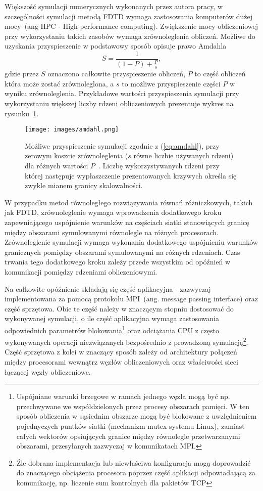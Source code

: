 
Większość symulacji numerycznych wykonanych przez autora pracy, w szczególności symulacji metodą FDTD wymaga zastosowania komputerów dużej mocy~(ang HPC - High-performance computing). Zwiększenie mocy obliczeniowej przy wykorzystaniu takich zasobów wymaga zrównoleglenia obliczeń. Możliwe do uzyskania przyspieszenie w podstawowy sposób opisuje prawo Amdahla
\begin{equation}
	S=\frac{1}{(1-P)+\frac{P}{s}},
	\label{eq:amdahl}
\end{equation}
gdzie przez $S$ oznaczono całkowite przyspieszenie obliczeń, $P$ to część obliczeń która może zostać zrównoleglona, a $s$ to możliwe przyspieszenie części $P$ w wyniku zrównoleglenia. Przykładowe wartości przyspieszenia symulacji przy wykorzystaniu większej liczby rdzeni obliczeniowych prezentuje wykres na rysunku~\ref{fig:amdhal}.

\begin{figure}[htb]
	\texttt{[image: images/amdahl.png]}
	\caption{Możliwe przyspieszenie symulacji zgodnie z (\ref{eq:amdahl}), przy zerowym koszcie zrównoleglenia ($s$ równe liczbie używanych rdzeni) dla różnych wartości $P$~\cite{wiki:amdhal}. Liczbę wykorzystywanych rdzeni przy której następuje wypłaszczenie prezentowanych krzywych określa się zwykle mianem granicy skalowalności.}
	\label{fig:amdhal}
\end{figure}

W przypadku metod równoległego rozwiązywania równań różniczkowych, takich jak FDTD, zrównoleglenie wymaga wprowadzenia dodatkowego kroku zapewniającego uspójnienie warunków na częściach siatki stanowiących granicę między obszarami symulowanymi równolegle na różnych procesorach. Zrównoleglenie symulacji wymaga wykonania dodatkowego uspójnieniu warunków granicznych pomiędzy obszarami symulowanymi na różnych rdzeniach. Czas trwania tego dodatkowego kroku zależy przede wszystkim od opóźnień w komunikacji pomiędzy rdzeniami obliczeniowymi. 

Na całkowite opóźnienie składają się część aplikacyjna - zazwyczaj implementowana za pomocą protokołu MPI~(ang. message passing interface) oraz część sprzętowa. Obie te część należy w znaczącym stopniu dostosować do wykonywanej symulacji, o ile część aplikacyjna wymaga zastosowania odpowiednich parametrów blokowania\footnote{Uspójniane warunki brzegowe w ramach jednego węzła mogą być np. przechwywane we współdzielonych przez procesy obszarach pamięci. W ten sposób obliczenia w sąsiednim obszarze mogą być blokowane z uwzlędnieniem pojednyczych puntków siatki (mechanizm mutex systemu Linux), zamiast całych wektorów opsiujących granice między równolegle przetwarzanymi obszarami, przesyłanych zazwyczaj w komunikatach MPI.} oraz odciążania CPU z często wykonywanych operacji niezwiązanych bezpośrednio z prowadzoną symulacją\footnote{Źle dobrana implementacja lub niewłaściwa konfiguracja mogą doprowadzić do znaczącego obciążenia procesora poprzez część aplikacji odpowiadającą za komunikację, np. liczenie sum kontrolnych dla pakietów TCP}. Część sprzętowa z kolei w znaczący sposób zależy od architektury połączeń między procesorami wewnątrz węzłów obliczeniowych oraz właściwości sieci łączącej węzły obliczeniowe. 

